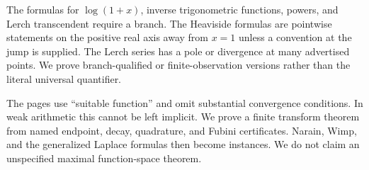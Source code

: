 \begin{audit}
The formulas for $\log(1+x)$, inverse trigonometric functions, powers, and
Lerch transcendent require a branch.  The Heaviside formulas are pointwise
statements on the positive real axis away from $x=1$ unless a convention at the
jump is supplied.  The Lerch series has a pole or divergence at many advertised
points.  We prove branch-qualified or finite-observation versions rather than
the literal universal quantifier.
\end{audit}

\begin{audit}
The pages use ``suitable function'' and omit substantial convergence
conditions.  In weak arithmetic this cannot be left implicit.  We prove a
finite transform theorem from named endpoint, decay, quadrature, and Fubini
certificates.  Narain, Wimp, and the generalized Laplace formulas then become
instances.  We do not claim an unspecified maximal function-space theorem.
\end{audit}
